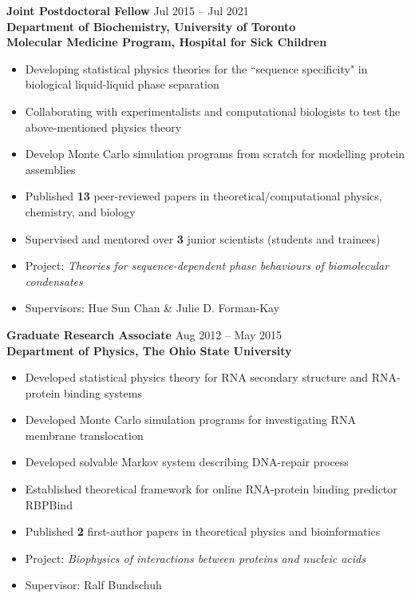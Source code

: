 \documentclass[11pt]{../yhlcv}
\begin{document}
{\bf Joint Postdoctoral Fellow} \hfill Jul 2015 -- Jul 2021 \vspace{0.25em} \\
{\bf Department of Biochemistry, University of Toronto  \\ 
Molecular Medicine Program, Hospital for Sick Children}
\vspace{-0.7em}\\
\begin{itemize}[leftmargin=*]\itemsep-0.2em
\item Developing statistical physics theories for the “sequence specificity" in biological liquid-liquid
phase separation
\item Collaborating with experimentalists and computational biologists to test the above-mentioned physics theory
\item Develop Monte Carlo simulation programs from scratch for modelling protein assemblies
\item Published {\bf 13} peer-reviewed papers in theoretical/computational physics, chemistry, and biology
\item Supervised and mentored over {\bf 3} junior scientists (students and trainees)

\item[] Project: {\it Theories for sequence-dependent phase behaviours of biomolecular condensates}
\item[] Supervisors: Hue Sun Chan \& Julie D. Forman-Kay
\end{itemize} 

{\bf Graduate Research Associate} \hfill Aug 2012 -- May 2015 \vspace{0.25em} \\
{\bf Department of Physics, The Ohio State University}
\vspace{-0.7em}\\
\begin{itemize}[leftmargin=*]\itemsep-0.2em
\item Developed statistical physics theory for RNA secondary structure and RNA-protein binding systems
\item Developed Monte Carlo simulation programs for investigating RNA membrane translocation
\item Developed solvable Markov system describing DNA-repair process
\item Established theoretical framework for online RNA-protein binding predictor RBPBind
\item Published {\bf 2} first-author papers in theoretical physics and bioinformatics
\item[] Project: {\it Biophysics of interactions between proteins and nucleic acids}
\item[] Supervisor: Ralf Bundschuh
\end{itemize}
\end{document}
